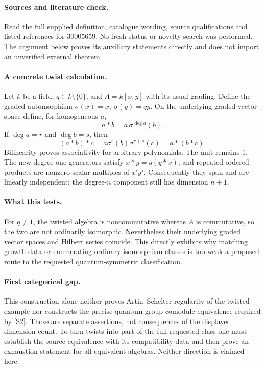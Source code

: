 \documentclass[11pt]{article}
\begin{document}
\paragraph{Sources and literature check.}
Read the full supplied definition, catalogue wording, source qualifications and listed references for 30005659. No fresh status or novelty search was performed. The argument below proves its auxiliary statements directly and does not import an unverified external theorem.

\paragraph{A concrete twist calculation.} Let \(k\) be a field, \(q\in k\setminus\{0\}\), and \(A=k[x,y]\) with its usual grading. Define the graded automorphism \(\sigma(x)=x,\ \sigma(y)=qy\). On the underlying graded vector space define, for homogeneous \(a\),
\[
 a*b=a\,\sigma^{\deg a}(b).
\]
If \(\deg a=r\) and \(\deg b=s\), then
\[
 (a*b)*c=a\sigma^r(b)\sigma^{r+s}(c)
 =a*(b*c).
\]
Bilinearity proves associativity for arbitrary polynomials. The unit remains \(1\). The new degree-one generators satisfy \(x*y=q(y*x)\), and repeated ordered products are nonzero scalar multiples of \(x^iy^j\). Consequently they span and are linearly independent; the degree-\(n\) component still has dimension \(n+1\).
\paragraph{What this tests.} For \(q\ne1\), the twisted algebra is noncommutative whereas \(A\) is commutative, so the two are not ordinarily isomorphic. Nevertheless their underlying graded vector spaces and Hilbert series coincide. This directly exhibits why matching growth data or enumerating ordinary isomorphism classes is too weak a proposed route to the requested quantum-symmetric classification.
\paragraph{First categorical gap.} This construction alone neither proves Artin--Schelter regularity of the twisted example nor constructs the precise quantum-group comodule equivalence required by [S2]. Those are separate assertions, not consequences of the displayed dimension count. To turn twists into part of the full requested class one must establish the source equivalence with its compatibility data and then prove an exhaustion statement for all equivalent algebras. Neither direction is claimed here.
\end{document}
